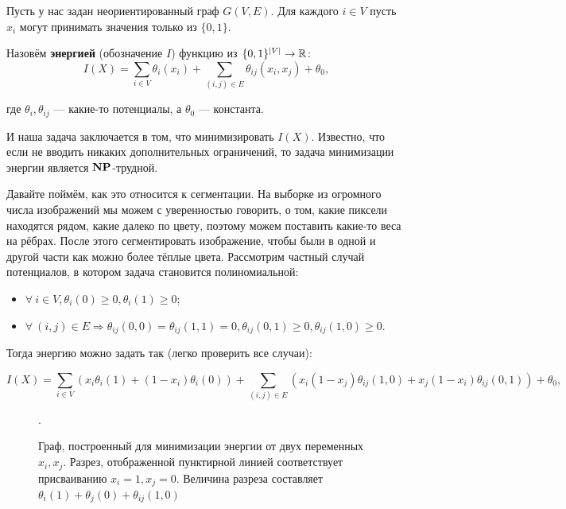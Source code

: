 Пусть у нас задан неориентированный граф $G(V, E)$. Для каждого $i \in V$ пусть
$x_i$ могут принимать значения только из $\{0, 1\}$.

\begin{Def}
  Назовём \textbf{энергией} (обозначение $I$) функцию из $\{0, 1\}^{|V|} \to
  \mathbb{R}$:
  \[
    I(X) = \sum_{i \in V} \theta_i(x_i) + \sum_{(i, j) \in E} \theta_{ij}(x_i, x_j) +
    \theta_0,
  \]

  где $\theta_i, \theta_{ij}$ --- какие-то потенциалы, а $\theta_0$ --- константа.
\end{Def}

И наша задача заключается в том, что минимизировать $I(X)$. Известно, что если
не вводить никаких дополнительных ограничений, то задача минимизации 
энергии является $\mathbf{NP}$-трудной.

Давайте поймём, как
это относится к сегментации. На выборке из огромного числа изображений мы
можем с уверенностью говорить, о том, какие пиксели находятся рядом, какие
далеко по цвету, поэтому можем поставить какие-то веса на рёбрах. После этого
сегментировать изображение, чтобы были в одной и другой части как можно
более тёплые цвета. Рассмотрим частный случай потенциалов, в котором задача
становится полиномиальной:

\begin{itemize}
  \item $\forall \ i \in V, \theta_i(0) \geqslant 0, \theta_i(1) \geqslant 0$;
  \item $\forall \ (i, j) \in E \Rightarrow \theta_{ij}(0, 0) = \theta_{ij}(1, 1) = 0, 
  \theta_{ij}(0, 1) \geqslant 0, \theta_{ij}(1, 0) \geqslant 0$.
\end{itemize}

Тогда энергию можно задать так (легко проверить все случаи):

\[
  I(X) = \sum_{i \in V} (x_i\theta_i(1) + (1 - x_i)\theta_i(0)) + 
  \sum_{(i, j) \in E} (x_i(1 - x_j)\theta_{ij}(1, 0) + 
  x_j(1 - x_i)\theta_{ij}(0, 1)) + \theta_0,
\]

\begin{figure}[H]
  \caption{Граф, построенный для минимизации энергии от двух переменных
  $x_i, x_j$. Разрез, отображенной пунктирной линией соответствует присваиванию 
  $x_i = 1, x_j = 0$. Величина разреза составляет $\theta_i(1) + \theta_j(0) +
  \theta_{ij}(1, 0)$}.
\end{figure}

